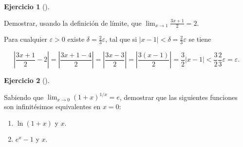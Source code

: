 \documentclass[
  spanish,
  a4paper,
]{scrreport}
\providecommand{\tightlist}{%
  \setlength{\itemsep}{0pt}\setlength{\parskip}{0pt}}
\theoremstyle{definition}
\newtheorem{exercise}{Ejercicio}[chapter]
\theoremstyle{remark}
\begin{document}
\begin{exercise}[]\protect\hypertarget{exr-4}{}\label{exr-4}

Demostrar, usando la definición de límite, que
\(\lim_{x\to 1}\frac{3x+1}{2}=2\).

\end{exercise}

\begin{tcolorbox}[enhanced jigsaw, arc=.35mm, bottomrule=.15mm, bottomtitle=1mm, breakable, colback=white, colbacktitle=quarto-callout-tip-color!10!white, colframe=quarto-callout-tip-color-frame, coltitle=black, left=2mm, leftrule=.75mm, opacityback=0, opacitybacktitle=0.6, rightrule=.15mm, title=\textcolor{quarto-callout-tip-color}{\faLightbulb}\hspace{0.5em}{Solución}, titlerule=0mm, toprule=.15mm, toptitle=1mm]

Para cualquier \(\varepsilon>0\) existe
\(\delta=\frac{2}{3}\varepsilon\), tal que si
\(|x-1|<\delta=\frac{2}{3}\varepsilon\) se tiene

\[
\left|\frac{3x+1}{2}-2\right|= \left|\frac{3x+1-4}{2}\right| = \left|\frac{3x-3}{2}\right| = \left|\frac{3(x-1)}{2}\right| = \frac{3}{2}|x-1|< \frac{3}{2}\frac{2}{3}\varepsilon = \varepsilon.
\]

\end{tcolorbox}

\begin{exercise}[]\protect\hypertarget{exr-5}{}\label{exr-5}

Sabiendo que \(\lim_{x\to 0}(1+x)^{1/x}=e\), demostrar que las
siguientes funciones son infinitésimos equivalentes en \(x=0\):

\begin{enumerate}
\def\labelenumi{\alph{enumi}.}
\tightlist
\item
  \(\ln(1+x)\) y \(x\).
\item
  \(e^x-1\) y \(x\).
\end{enumerate}

\end{exercise}
\end{document}

